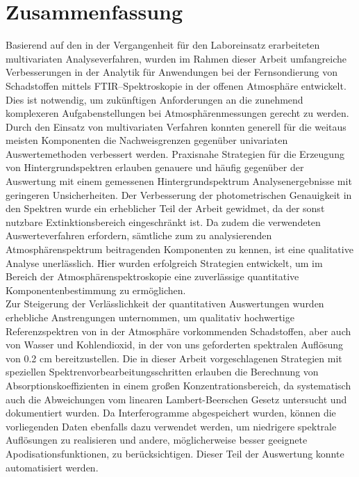 \chapter{\label{zusammenfassung}Zusammenfassung}

Basierend auf den in der Vergangenheit f\"{u}r den Laboreinsatz
erarbeiteten multivariaten Analyseverfahren, wurden im Rahmen
dieser Arbeit umfangreiche Verbesserungen in der Analytik f\"{u}r
Anwendungen bei der Fernsondierung von Schadstoffen mittels
FTIR--Spektroskopie in der offenen Atmosph\"{a}re entwickelt. Dies ist
notwendig, um zuk\"{u}nftigen Anforderungen an die zunehmend
komplexeren Aufgabenstellungen bei Atmosph\"{a}renmessungen gerecht zu
werden. Durch den Einsatz von multivariaten Verfahren konnten
generell f\"{u}r die weitaus meisten Komponenten die Nachweisgrenzen
gegen\"{u}ber univariaten Auswertemethoden verbessert werden.
Praxisnahe Strategien f\"{u}r die Erzeugung von Hintergrundspektren
erlauben genauere und h\"{a}ufig gegen\"{u}ber der Auswertung mit einem
gemessenen Hintergrundspektrum Analysenergebnisse mit geringeren
Unsicherheiten. Der Verbesserung der photometrischen Genauigkeit
in den Spektren wurde ein erheblicher Teil der Arbeit gewidmet, da
der sonst nutzbare Extinktionsbereich eingeschr\"{a}nkt ist. Da zudem
die verwendeten Auswerteverfahren erfordern, s\"{a}mtliche zum zu
analysierenden Atmosph\"{a}renspektrum beitragenden Komponenten zu
kennen, ist eine qualitative Analyse unerl\"{a}sslich. Hier wurden
erfolgreich Strategien entwickelt, um im Bereich der
Atmosph\"{a}renspektroskopie eine zuverl\"{a}ssige quantitative
Komponentenbestimmung zu erm\"{o}glichen.\\

Zur Steigerung der Verl\"{a}sslichkeit der quantitativen Auswertungen
wurden erhebliche Anstrengungen unternommen, um qualitativ
hochwertige Referenzspektren von in der Atmosph\"{a}re vorkommenden
Schadstoffen, aber auch von Wasser und Kohlendioxid, in der von
uns geforderten spektralen Aufl\"{o}sung von 0.2 cm
bereitzustellen. Die in dieser Arbeit vorgeschlagenen Strategien
mit speziellen Spektrenvorbearbeitungsschritten erlauben die
Berechnung von Absorptionskoeffizienten in einem gro{\ss}en
Konzentrationsbereich, da systematisch auch die Abweichungen vom
linearen Lambert-Beerschen Gesetz untersucht und dokumentiert
wurden. Da Interferogramme abgespeichert wurden, k\"{o}nnen die
vorliegenden Daten ebenfalls dazu verwendet werden, um niedrigere
spektrale Aufl\"{o}sungen zu realisieren und andere, m\"{o}glicherweise
besser geeignete Apodisationsfunktionen, zu ber\"{u}cksichtigen.
Dieser Teil der Auswertung konnte automatisiert werden.\\

